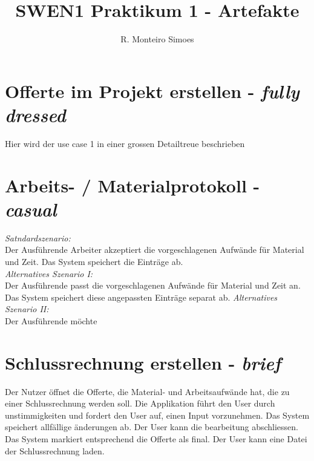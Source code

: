 \documentclass[journal]{combine}
\begin{document}
	
	\title{SWEN1 Praktikum 1 - Artefakte}
	\author{ R. Monteiro Simoes}
	\maketitle

	\newpage

	\tableofcontents

	\newpage
	
	\section{Offerte im Projekt erstellen - \emph{fully dressed}}
		Hier wird der use case 1 in einer grossen Detailtreue beschrieben
	\newpage
	\section{Arbeits- / Materialprotokoll  - \emph{casual}}
		\emph{Satndardszenario:} \\
		Der Ausführende Arbeiter akzeptiert die vorgeschlagenen Aufwände für Material
		und Zeit. Das System speichert die Einträge ab.\\
		\emph{Alternatives Szenario I:}\\
		Der Ausführende passt die vorgeschlagenen Aufwände für Material und Zeit an.
		Das System speichert diese angepassten Einträge separat ab.
		\emph{Alternatives Szenario II:}\\
		Der Ausführende möchte
	\newpage
	\section{Schlussrechnung erstellen - \emph{brief}}
		Der Nutzer öffnet die Offerte, die Material- und Arbeitsaufwände hat,
		die zu einer Schlussrechnung werden soll. Die Applikation führt den User durch
		unstimmigkeiten und fordert den User auf, einen Input vorzunehmen. Das System
		speichert allfällige änderungen ab. Der User kann die bearbeitung abschliessen.
		Das System markiert entsprechend die Offerte als final. Der User kann eine Datei der 
		Schlussrechnung laden.
\end{document}
